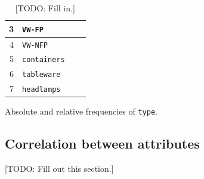 \documentclass[dtu]{dtuarticle}
\newcommand{\todo}[1]{\color{red}[TODO: #1]\color{black}}
\begin{document}
\begin{table}[h!]
\begin{subtable}{.3\textwidth}
\begin{tabular}{r|l|l|l}
				3 & \texttt{VW-FP}      &                &                \\ \hline
				4 & \texttt{VW-NFP}     &                &                \\ \hline
				5 & \texttt{containers} &                &                \\ \hline
				6 & \texttt{tableware}  &                &                \\ \hline
				7 & \texttt{headlamps}  &                &
			\end{tabular}
			\caption{Absolute and relative frequencies of \texttt{type}.}
			\label{table:frequencies}
		\end{subtable}
		\caption{\todo{Fill in.}}
	\end{table}

	\subsection{Correlation between attributes}

	\todo{Fill out this section.}
\end{document}

